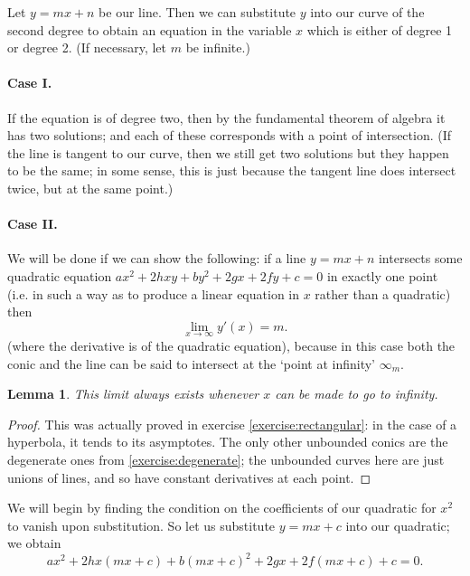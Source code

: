 \documentclass[a4paper,leqno,10pt]{article}
\theoremstyle{exercise}
\theoremstyle{plain}
\newtheorem*{lem}{Lemma}
\theoremstyle{definition}
\theoremstyle{remark}
\begin{document}
Let $ y = mx + n $ be our line. Then we can substitute $ y $ into our curve of the second degree to obtain an equation
in the variable $ x $ which is either of degree 1 or degree 2. (If necessary, let $ m $ be infinite.)

\paragraph{Case I.} If the equation is of degree two, then by the fundamental theorem of algebra it
has two solutions; and each of these corresponds with a point of intersection. (If the line is tangent
to our curve, then we still get two solutions but they happen to be the same; in some sense, this is
just because the tangent line does intersect twice, but at the same point.)

\paragraph{Case II.} We will be done if we can show the following: if a line $ y = mx + n $ intersects
some quadratic equation $ ax^2 + 2hxy + by^2 + 2gx + 2fy + c = 0 $ in exactly one point (i.e. in such a
way as to produce a linear equation in $ x $ rather than a quadratic) then
\begin{equation}
  \lim_{x \to \infty} y'(x) = m.
\end{equation}
(where the derivative is of the quadratic equation), because in this case both the conic
and the line can be said to intersect at the `point at infinity' $ \infty_m $.

\begin{lem}
  This limit always exists whenever $ x $ can be made to go to infinity.
\end{lem}
\begin{proof}
  This was actually proved in exercise \ref{exercise:rectangular}: in the case of a hyperbola, it tends
  to its asymptotes. The only other unbounded conics are the degenerate ones from \ref{exercise:degenerate};
  the unbounded curves here are just unions of lines, and so have constant derivatives at each point.
\end{proof}

We will begin by finding the condition on the coefficients of our quadratic for $ x^2 $ to vanish upon substitution.
So let us substitute $ y = mx + c $ into our quadratic; we obtain
\begin{displaymath}
  ax^2 + 2hx(mx + c) + b(mx + c)^2 + 2gx + 2f(mx + c) + c = 0.
\end{displaymath}
\end{document}
